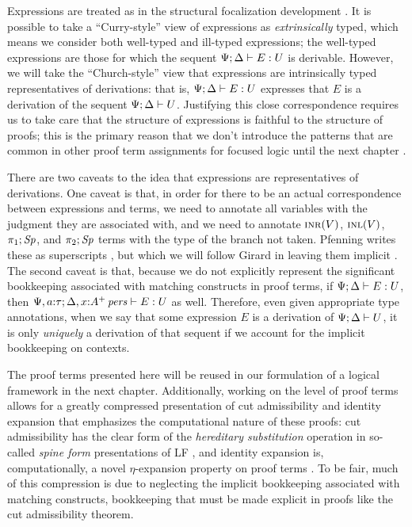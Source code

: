 Expressions are treated as in the structural focalization development
\cite{simmons11structural}. It is possible to take a ``Curry-style''
view of expressions as {\it extrinsically} typed, which means we
consider both well-typed and ill-typed expressions; the well-typed
expressions are those for which the sequent
${\Psi}; {\Delta} \vdash {E} : {U}$ is derivable. However, we will take the
``Church-style'' view that expressions are intrinsically typed
representatives of derivations: that is, ${\Psi}; {\Delta} \vdash {E} : {U}$
expresses that $E$ is a derivation of the sequent
${\Psi};{\Delta} \vdash {U}$. Justifying this close correspondence requires
us to take care that the structure of expressions is faithful to the
structure of proofs; this is the primary reason that we don't
introduce the patterns that are common in other proof term assignments
for focused logic until the next chapter
\cite{watkins02concurrent,licata08focusing,krishnaswami09focusing}.

There are two caveats to the idea that expressions are representatives
of derivations. One caveat is that, in order for there to be an actual
correspondence between expressions and terms, we need to annotate all
variables with the judgment they are associated with, and we need to
annotate $\textsc{inr}({V})$, $\textsc{inl}({V})$, $\pi_1;{{\it Sp}}$, and $\pi_2;{{\it Sp}}$
terms with the type of the branch not taken. Pfenning writes these as
superscripts \cite{pfenning08church}, but which we will follow Girard
in leaving them implicit \cite{girard89proofs}. The second caveat is
that, because we do not explicitly represent the significant
bookkeeping associated with matching constructs in proof terms, if
${\Psi}; {\Delta} \vdash {E} : {U}$, then ${\Psi, a{:}\tau}; {\Delta,
  x{:}{A^+}\,{{\it pers}}} \vdash {E} : {U}$ as well. Therefore, even given appropriate
type annotations, when we say that some expression $E$ is a derivation
of ${\Psi};{\Delta} \vdash {U}$, it is only {\it uniquely} a derivation of
that sequent if we account for the implicit bookkeeping on contexts.

The proof terms presented here will be reused in our formulation of a
logical framework in the next chapter.  Additionally, working on the
level of proof terms allows for a greatly compressed presentation of
cut admissibility and identity expansion that emphasizes the
computational nature of these proofs: cut admissibility has the clear
form of the {\it hereditary substitution} operation in so-called {\it
  spine form} presentations of LF \cite{cervesato02linear}, and
identity expansion is, computationally, a novel $\eta$-expansion
property on proof terms \cite{simmons11structural}.  To be fair, much
of this compression is due to neglecting the implicit bookkeeping
associated with matching constructs, bookkeeping that must be made
explicit in proofs like the cut admissibility theorem.

